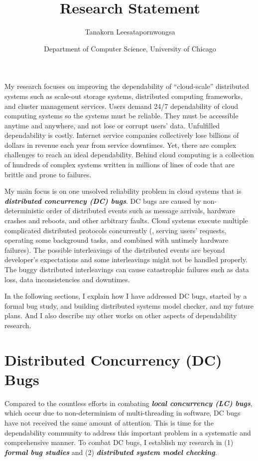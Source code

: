 \documentclass[11pt]{article}
\begin{document}
\title{Research Statement}
\author{Tanakorn Leesatapornwongsa}
\date{\vspace{-1ex} \small{Department of Computer Science, University of
Chicago}}

\maketitle

My research focuses on improving the dependability of ``cloud-scale''
distributed systems such as scale-out storage systems, distributed computing
frameworks, and cluster management services. Users demand 24/7 dependability of
cloud computing systems so the systems must be reliable. They must be
accessible anytime and anywhere, and not lose or corrupt users' data.
Unfulfilled dependability is costly. Internet service companies collectively
lose billions of dollars in revenue each year from service downtimes. Yet,
there are complex challenges to reach an ideal dependability. Behind cloud
computing is a collection of hundreds of complex systems written in millions of
lines of code that are brittle and prone to failures.

My main focus is on one unsolved reliability problem in cloud systems that is
\textbf{\textit{distributed concurrency (DC) bugs}}. DC bugs are caused by
non-deterministic order of distributed events such as message arrivals, hardware
crashes and reboots, and other arbitrary faults. Cloud systems execute multiple
complicated distributed protocols concurrently (\eg, serving users' requests,
operating some background tasks, and combined with untimely hardware failures).
The possible interleavings of the distributed events are beyond developer's
expectations and some interleavings might not be handled properly.  The buggy
distributed interleavings can cause catastrophic failures such as data loss,
data inconsistencies and downtimes.

In the following sections, I explain how I have addressed DC bugs, started by a
formal bug study, and building distributed systems model checker, and my future
plans. And I also describe my other works on other aspects of dependability
research.

\section{Distributed Concurrency (DC) Bugs}\label{dcbugs}

Compared to the countless efforts in combating \textbf{\textit{local concurrency
(LC) bugs}}, which occur due to non-determinism of multi-threading in software,
DC bugs have not received the same amount of attention. This is time for the
dependability community to address this important problem in a systematic and
comprehensive manner. To combat DC bugs, I establish my research in (1)
\textbf{\textit{formal bug studies}} and (2) \textbf{\textit{distributed system
model checking}}. 
\end{document}
